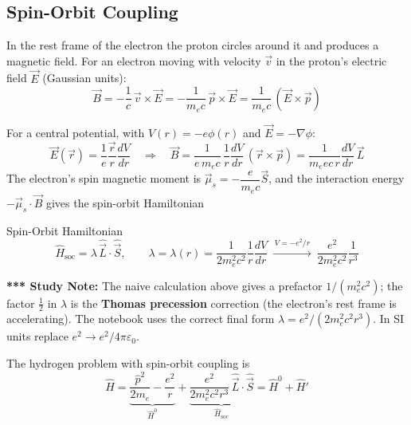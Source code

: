 \documentclass[11pt,a4paper]{article}
\begin{document}
\subsection{Spin-Orbit Coupling}
In the rest frame of the electron the proton circles around it and produces a magnetic field. For an electron moving with velocity $\vec v$ in the proton's electric field $\vec E$ (Gaussian units):
\[
\vec B = -\frac1c\,\vec v\times\vec E = -\frac{1}{m_ec}\,\vec p\times\vec E = \frac{1}{m_ec}\,(\vec E\times\vec p)
\]
\begin{center}
\end{center}
For a central potential, with $V(r) = -e\phi(r)$ and $\vec E = -\nabla\phi$:
\[
\vec E(\vec r) = \frac{1}{e}\frac{\vec r}{r}\frac{dV}{dr}
\quad\Longrightarrow\quad
\vec B = \frac{1}{e\,m_e c}\,\frac1r\frac{dV}{dr}\,(\vec r\times\vec p) = \frac{1}{m_e e c\, r}\frac{dV}{dr}\,\vec L
\]
The electron's spin magnetic moment is $\vec\mu_s = -\dfrac{e}{m_ec}\vec S$, and the interaction energy $-\vec\mu_s\cdot\vec B$ gives the spin-orbit Hamiltonian
\begin{thm}{Spin-Orbit Hamiltonian}
\[
\hat H_{\text{soc}} = \lambda\,\hat{\vec L}\cdot\hat{\vec S}, \qquad \lambda = \lambda(r) = \frac{1}{2m_e^2c^2}\frac1r\frac{dV}{dr}\ \xrightarrow{\,V=-e^2/r\,}\ \frac{e^2}{2m_e^2c^2}\frac{1}{r^3}
\]
\end{thm}
\textbf{*** Study Note:} The naive calculation above gives a prefactor $1/(m_e^2c^2)$; the factor $\tfrac12$ in $\lambda$ is the \textbf{Thomas precession} correction (the electron's rest frame is accelerating). The notebook uses the correct final form $\lambda = e^2/(2m_e^2c^2r^3)$. In SI units replace $e^2\to e^2/4\pi\varepsilon_0$.

The hydrogen problem with spin-orbit coupling is
\[
\hat H = \underbrace{\frac{\hat p^2}{2m_e} - \frac{e^2}{r}}_{\hat H^0} + \underbrace{\frac{e^2}{2m_e^2c^2r^3}\,\hat{\vec L}\cdot\hat{\vec S}}_{\hat H_{\text{soc}}} = \hat H^0 + \hat H'
\]
\end{document}

